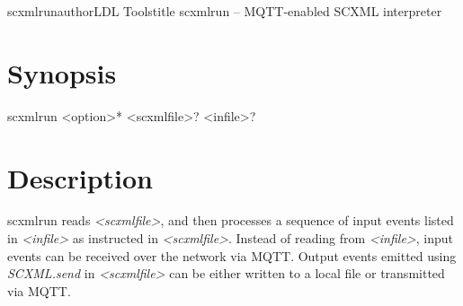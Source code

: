 \documentclass[fancy]{article}
\begin{document}
\begin{Name}{1}{scxmlrun}{author}{LDL Tools}{title}
scxmlrun -- MQTT-enabled SCXML interpreter
\end{Name}

\section{Synopsis}
scxmlrun <option>* <scxmlfile>? <infile>?

\section{Description}
scxmlrun reads \emph{<scxmlfile>}, and then processes 
a sequence of input events listed in \emph{<infile>} as instructed in \emph{<scxmlfile>}.
Instead of reading from \emph{<infile>},
input events can be received over the network via MQTT.
Output events emitted using \emph{SCXML.send} in \emph{<scxmlfile>} can be
either written to a local file or transmitted via MQTT.
\end{document}
